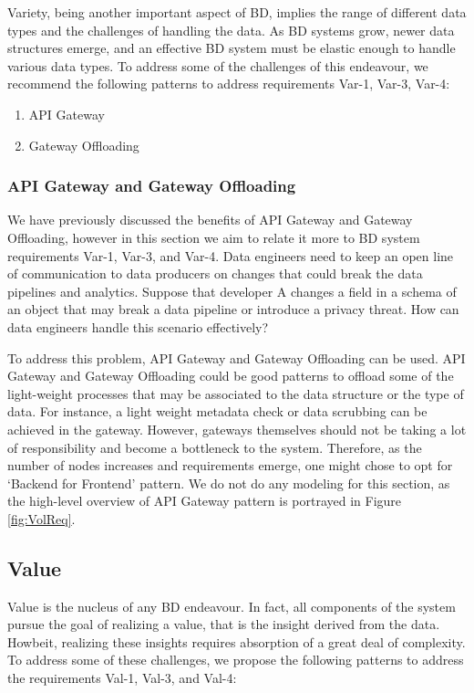 \documentclass{bmcart}
\begin{document}
Variety, being another important aspect of BD, implies the range of different data types and the challenges of handling the data. As BD systems grow, newer data structures emerge, and an effective BD system must be elastic enough to handle various data types. To address some of the challenges of this endeavour, we recommend the following patterns to address requirements Var-1, Var-3, Var-4:

\begin{enumerate}
  \item API Gateway
  \item Gateway Offloading
\end{enumerate}


\subsubsection{API Gateway and Gateway Offloading}

We have previously discussed the benefits of API Gateway and Gateway Offloading, however in this section we aim to relate it more to BD system requirements Var-1, Var-3, and Var-4. Data engineers need to keep an open line of communication to data producers on changes that could break the data pipelines and analytics. Suppose that developer A changes a field in a schema of an object that may break a data pipeline or introduce a privacy threat. How can data engineers handle this scenario effectively? 

To address this problem, API Gateway and Gateway Offloading can be used. API Gateway and Gateway Offloading could be good patterns to offload some of the light-weight processes that may be associated to the data structure or the type of data. For instance, a light weight metadata check or data scrubbing can be achieved in the gateway. However, gateways themselves should not be taking a lot of responsibility and become a bottleneck to the system. Therefore, as the number of nodes increases and requirements emerge, one might chose to opt for `Backend for Frontend' pattern. We do not do any modeling for this section, as the high-level overview of API Gateway pattern is portrayed in Figure \ref{fig:VolReq}.

\subsection{Value}

Value is the nucleus of any BD endeavour. In fact, all components of the system pursue the goal of realizing a value, that is the insight derived from the data. Howbeit, realizing these insights requires absorption of a great deal of complexity. To address some of these challenges, we propose the following patterns to address the requirements Val-1, Val-3, and Val-4:
\end{document}
